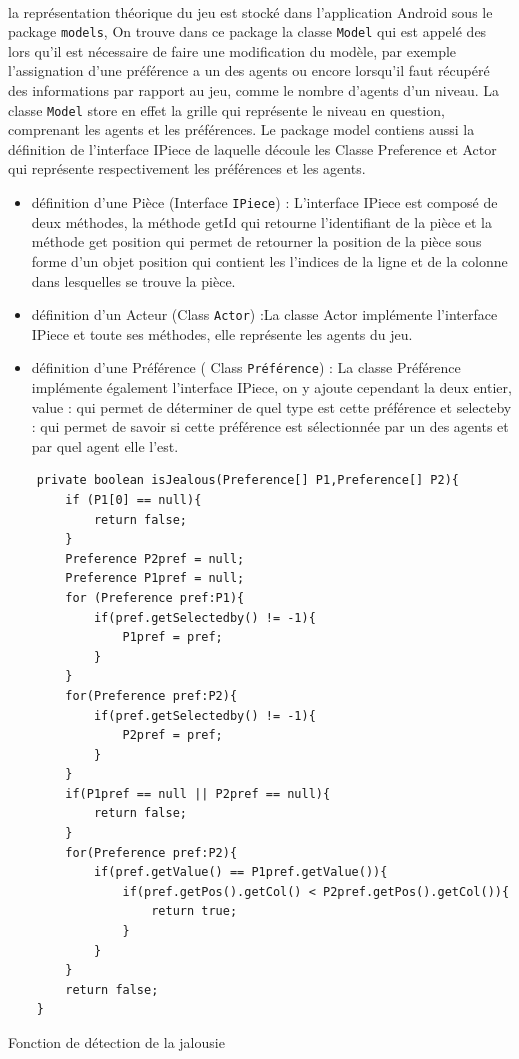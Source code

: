 \documentclass[a4paper, 10pt]{article}
\begin{document}
\paragraph{}
la représentation théorique du jeu est stocké dans l'application Android sous le package \texttt{models}, On trouve dans ce package la classe \texttt{Model} qui est appelé des lors qu'il est nécessaire de faire une modification du modèle, par exemple l'assignation d'une préférence a un des agents ou encore lorsqu'il faut récupéré des informations par rapport au jeu, comme le nombre d'agents d'un niveau. La classe 
\texttt{Model} store en effet la grille qui représente le niveau en question, comprenant les agents et les préférences. Le package model contiens aussi la définition de l’interface IPiece de laquelle découle les Classe Preference et Actor qui représente respectivement les préférences et les agents.
 \begin{itemize}
\item définition d'une Pièce (Interface \texttt{IPiece}) : L’interface IPiece est composé de deux méthodes, la méthode getId qui retourne l'identifiant de la pièce et la méthode get position qui permet de retourner la position de la pièce sous forme d’un objet position qui contient les l’indices de la ligne et de la colonne dans lesquelles se trouve la pièce.   
\item définition d’un Acteur (Class \texttt{Actor}) :La classe Actor implémente l'interface IPiece et toute ses méthodes, elle représente les agents du jeu.                                                                                                                                                                                                                                                                                                                                      
\item définition d’une Préférence ( Class \texttt{Préférence}) : La classe Préférence implémente également l’interface IPiece, on y ajoute cependant la deux entier, value : qui permet de déterminer de quel type est cette préférence et selecteby : qui permet de savoir si cette préférence est sélectionnée par un des agents et par quel agent elle l’est. 
\end{itemize}
\hfill \break
\begin{lstlisting}
    private boolean isJealous(Preference[] P1,Preference[] P2){
        if (P1[0] == null){
            return false;
        }
        Preference P2pref = null;
        Preference P1pref = null;
        for (Preference pref:P1){
            if(pref.getSelectedby() != -1){
                P1pref = pref;
            }
        }
        for(Preference pref:P2){
            if(pref.getSelectedby() != -1){
                P2pref = pref;
            }
        }
        if(P1pref == null || P2pref == null){
            return false;
        }
        for(Preference pref:P2){
            if(pref.getValue() == P1pref.getValue()){
                if(pref.getPos().getCol() < P2pref.getPos().getCol()){
                    return true;
                }
            }
        }
        return false;
    }
\end{lstlisting}
Fonction de détection de la jalousie 
\end{document}
